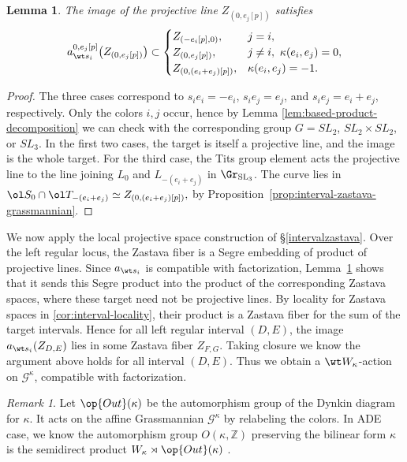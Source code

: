 \documentclass{amsart}
\numberwithin{equation}{section}
\numberwithin{figure}{section}
\newtheorem{lem}[thm]{Lemma}
\theoremstyle{definition}
\theoremstyle{remark}
\newtheorem{rmk}[thm]{Remark}
\renewcommand{\c}[1]{\mathcal{#1}}
\renewcommand{\b}[1]{\mathbb{#1}}
\renewcommand{\r}[1]{\mathrm{#1}}
\newcommand{\SL}{\r{SL}}
\begin{document}
\begin{lem}
	\label{lem:tits-elementary-line}
	The image of the projective line $Z_{(0,e_j[p])}$ satisfies
\[
a_{\wt s_i}^{0,e_j[p]}\bigl(Z_{(0,e_j[p])}\bigr)
\subset
\begin{cases}
	Z_{(-e_i[p],0)},&j=i,\\
	Z_{(0,e_j[p])},&j\ne i,\ \kappa(e_i,e_j)=0,\\
	Z_{(0,(e_i+e_j)[p])},&\kappa(e_i,e_j)=-1.
\end{cases}
\]
\end{lem}
\begin{proof}
	The three cases correspond to
	$s_i e_i=-e_i$, $s_i e_j=e_j$, and
	$s_i e_j=e_i+e_j$, respectively.
	Only the colors $i,j$ occur, hence by Lemma \ref{lem:based-product-decomposition} we can check with the
	corresponding group $G=SL_2$, $SL_2\times SL_2$,
	or $SL_3$. In the first two cases, the target is itself a projective
	line, and the image is the whole target.
	For the third case, the Tits group element acts the projective line to the line joining $L_0$ and $L_{-(e_i+e_j)}$ in $\Gr_{\SL_3}$.
	The curve lies in $\ol S_0\cap\ol T_{-(e_i+e_j)}
	\simeq Z_{(0,(e_i+e_j)[p])},$
	by Proposition~\ref{prop:interval-zastava-grassmannian}.
\end{proof}
We now apply the local projective space construction of
\S\ref{intervalzastava}. Over the left regular locus, the
Zastava fiber is a Segre embedding of product of
projective lines.
Since $a_{\wt s_i}$ is compatible with factorization,
Lemma~\ref{lem:tits-elementary-line} shows that it
sends this Segre product into the product of the
corresponding Zastava spaces, where these target need not be projective lines. By locality for Zastava spaces in \ref{cor:interval-locality}, their product is a Zastava fiber for
the sum of the target intervals. Hence for all left regular interval $(D,E)$, the image $a_{\wt s_i}(Z_{D,E})$ lies in some Zastava fiber $Z_{F,G}$. Taking closure we know the argument above holds for all interval $(D,E)$. Thus we obtain a $\wt W_\kappa$-action on
$\c G^\kappa$, compatible with factorization.

\begin{rmk}
	Let $\op{Out}(\kappa)$ be the automorphism group of the Dynkin diagram for $\kappa$. It acts on the affine Grassmannian $\c G^\kappa$ by	relabeling the colors. In ADE case, we know the automorphism group $O(\kappa,\b Z)$ preserving the bilinear form $\kappa$ is the semidirect product $W_\kappa\rtimes\op{Out}(\kappa)$ \cite[D.40]{fulton2013representation}.
\end{rmk}
\end{document}
